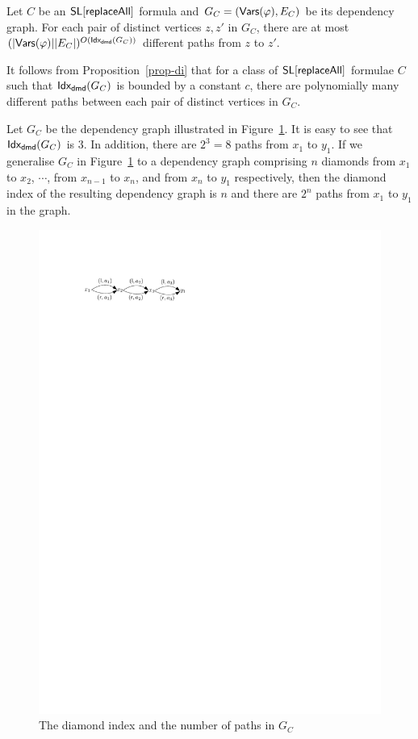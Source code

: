 \begin{proposition}\label{prop-di}
Let $C$  be an  $\mathsf{SL}[\mathsf{replaceAll}]$ formula and $G_C=(\mathsf{Vars}(\varphi), E_C)$ be its dependency graph. For each pair of distinct vertices $z,z'$ in $G_C$, there are at most $(|\mathsf{Vars}(\varphi)||E_C|)^{O({\sf Idx_{dmd}}(G_C))}$ different paths from $z$ to $z'$.
\end{proposition}
It follows from Proposition~\ref{prop-di} that for a class of $\mathsf{SL}[\mathsf{replaceAll}]$ formulae $C$ such that ${\sf Idx_{dmd}}(G_C)$ is bounded by a constant $c$,  there are polynomially many different paths between each pair of distinct vertices in $G_C$.

\begin{example}
Let $G_C$ be the dependency graph illustrated in Figure~\ref{fig-dmdidx-exmp}. It is easy to see that ${\sf Idx_{dmd}}(G_C)$ is $3$. In addition, there are $2^3=8$ paths from $x_1$ to $y_1$. If we generalise $G_C$ in Figure~\ref{fig-dmdidx-exmp} to a dependency graph comprising $n$ diamonds from $x_1$ to $x_2$, $\cdots$, from $x_{n-1}$ to $x_n$, and from $x_n$ to $y_1$ respectively, then the diamond index of the resulting dependency graph is $n$ and there are $2^n$ paths from $x_1$ to $y_1$ in the graph.
\begin{figure}[htbp]
\begin{center}
\includegraphics[scale=0.7]{dmdidx-example.pdf}
\end{center}
\caption{The diamond index  and the number of paths in $G_C$}\label{fig-dmdidx-exmp}
\end{figure}
\end{example}

